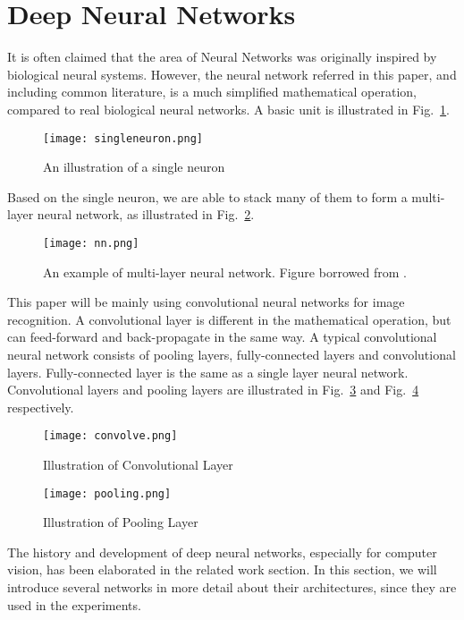 \section{Deep Neural Networks}
It is often claimed that the area of Neural Networks was originally inspired by biological neural systems. However, the neural network referred in this paper, and including common literature, is a much simplified mathematical operation, compared to real biological neural networks. A basic unit is illustrated in Fig.~\ref{fig:singleneuron}.
\begin{figure}[!htp]
	\centering
	\texttt{[image: singleneuron.png]}
	\caption[An illustration of a single neuron]
	{An illustration of a single neuron}
	\label{fig:singleneuron}
\end{figure}
Based on the single neuron, we are able to stack many of them to form a multi-layer neural network, as illustrated in Fig.~\ref{fig:nn}.
\begin{figure}[!htp]
	\centering
	\texttt{[image: nn.png]}
	\caption[Illustration of Neural Network]
	{An example of multi-layer neural network. Figure borrowed from \parencite{lecun2015deep}.}
	\label{fig:nn}
\end{figure}
This paper will be mainly using convolutional neural networks for image recognition. A convolutional layer is different in the mathematical operation, but can feed-forward and back-propagate in the same way. A typical convolutional neural network consists of pooling layers, fully-connected layers and convolutional layers. Fully-connected layer is the same as a single layer neural network. Convolutional layers and pooling layers are illustrated in Fig.~\ref{fig:convolve} and Fig.~\ref{fig:pooling} respectively. 
\begin{figure}[!htp]
	\centering
	\texttt{[image: convolve.png]}
	\caption[Illustration of Convolutional Layer]
	{Illustration of Convolutional Layer}
	\label{fig:convolve}
\end{figure}
\begin{figure}[!htp]
	\centering
	\texttt{[image: pooling.png]}
	\caption[Illustration of Pooling Layer]
	{Illustration of Pooling Layer}
	\label{fig:pooling}
\end{figure}

The history and development of deep neural networks, especially for computer vision, has been elaborated in the related work section. In this section, we will introduce several networks in more detail about their architectures, since they are used in the experiments.


